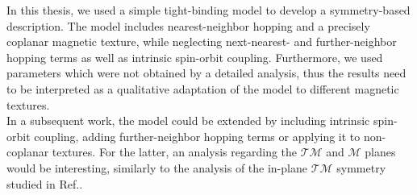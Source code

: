 In this thesis, we used a simple tight-binding model to develop a symmetry-based description. The model includes nearest-neighbor hopping and a precisely coplanar magnetic texture, while neglecting next-nearest- and further-neighbor hopping terms as well as intrinsic spin-orbit coupling.
Furthermore, we used parameters which were not obtained by a detailed analysis, thus the results need to be interpreted as a qualitative adaptation of the model to different magnetic textures.\\

In a subsequent work, the model could be extended by including intrinsic spin-orbit coupling, adding further-neighbor hopping terms or applying it to non-coplanar textures.
For the latter, an analysis regarding the $\mathcal{TM}$ and $\mathcal{M}$ planes would be interesting, similarly to the analysis of the in-plane $\mathcal{TM}$ symmetry studied in Ref.\cite{MnPtSOC}.\\
